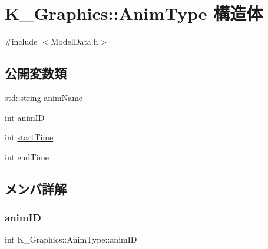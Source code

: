 \hypertarget{struct_k___graphics_1_1_anim_type}{}\section{K\+\_\+\+Graphics\+:\+:Anim\+Type 構造体}
\label{struct_k___graphics_1_1_anim_type}


{\ttfamily \#include $<$Model\+Data.\+h$>$}

\subsection*{公開変数類}
\begin{DoxyCompactItemize}
\item 
std\+::string \mbox{\hyperlink{struct_k___graphics_1_1_anim_type_a9237cfdcfb0a4c88b12fcda8c564e357}{anim\+Name}}
\item 
int \mbox{\hyperlink{struct_k___graphics_1_1_anim_type_a866adf75cd1f6cccc09424878a4f73df}{anim\+ID}}
\item 
int \mbox{\hyperlink{struct_k___graphics_1_1_anim_type_ae4b54d9628ffca188aafcfb3c150f667}{start\+Time}}
\item 
int \mbox{\hyperlink{struct_k___graphics_1_1_anim_type_a91f2b93fc91fe796af8f21b23f86f71a}{end\+Time}}
\end{DoxyCompactItemize}


\subsection{メンバ詳解}
\mbox{\label{struct_k___graphics_1_1_anim_type_a866adf75cd1f6cccc09424878a4f73df}} 
\subsubsection{\texorpdfstring{anim\+ID}{animID}}
{\footnotesize\ttfamily int K\+\_\+\+Graphics\+::\+Anim\+Type\+::anim\+ID}

\mbox{\label{struct_k___graphics_1_1_anim_type_a9237cfdcfb0a4c88b12fcda8c564e357}} 
